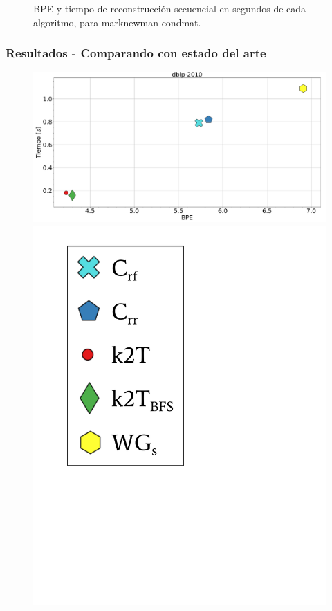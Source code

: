 \begin{frame}
\begin{figure}
	\caption{BPE y tiempo de reconstrucción secuencial en segundos de cada algoritmo, para marknewman-condmat.}
\end{figure}

\end{frame}

\begin{frame}
\frametitle{Resultados - Comparando con estado del arte}

\begin{figure}
	\centering
	
    	\begin{minipage}{1\textwidth}
    		\centering
    		\begin{minipage}{0.8\textwidth}
    			\centering
    			\includegraphics[width=1\linewidth]{../img/bpeTimes/secuencial/dblp-2010.pdf}
    		\end{minipage}
    		\begin{minipage}{0.15\textwidth}
    			\centering
    			\includegraphics[scale=.16, clip, trim=70 200 280 40]{../img/bpeTimes/labelSec.pdf}

\end{minipage}
\end{minipage}
\end{figure}
\end{frame}
